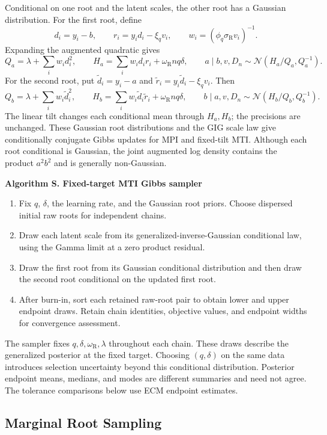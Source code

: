 \documentclass[11pt]{article}
\newcommand{\Normal}{\mathcal{N}}
\newcounter{algorithm}
\renewcommand{\thealgorithm}{S\arabic{algorithm}}
\newenvironment{algorithmblock}[1]{%
  \refstepcounter{algorithm}\par\medskip
  \noindent\textbf{Algorithm \thealgorithm. #1}\par
  \begin{enumerate}[leftmargin=2.2em,itemsep=0.25em,parsep=0pt]%
}{%
  \end{enumerate}\par\medskip
}
\begin{document}
Conditional on one root and the latent scales, the other root has a Gaussian
distribution. For the first root, define
\[
d_i=y_i-b,\qquad r_i=y_i d_i-\xi_qv_i,\qquad
w_i=(\phi_q\sigma_{\mathrm R}v_i)^{-1}.
\]
Expanding the augmented quadratic gives
\[
Q_a=\lambda+\sum_iw_i d_i^2,\qquad
H_a=\sum_iw_i d_i r_i+\omega_{\mathrm R}nq\delta,
\qquad a\mid b,v,D_n\sim\Normal(H_a/Q_a,Q_a^{-1}).
\]
For the second root, put \(\widetilde d_i=y_i-a\) and
\(\widetilde r_i=y_i\widetilde d_i-\xi_qv_i\). Then
\[
Q_b=\lambda+\sum_iw_i\widetilde d_i^2,\qquad
H_b=\sum_iw_i\widetilde d_i\widetilde r_i+\omega_{\mathrm R}nq\delta,
\qquad b\mid a,v,D_n\sim\Normal(H_b/Q_b,Q_b^{-1}).
\]
The linear tilt changes each conditional mean through \(H_a,H_b\); the
precisions are unchanged. These Gaussian root distributions and the GIG scale
law give conditionally conjugate Gibbs updates for MPI and fixed-tilt MTI.
Although each root conditional is Gaussian, the joint augmented log density
contains the product \(a^2b^2\) and is generally non-Gaussian.

\begin{algorithmblock}{Fixed-target MTI Gibbs sampler}
\item Fix \(q\), \(\delta\), the learning rate, and the Gaussian root priors.
Choose dispersed initial raw roots for independent chains.
\item Draw each latent scale from its generalized-inverse-Gaussian conditional
law, using the Gamma limit at a zero product residual.
\item Draw the first root from its Gaussian conditional distribution and then
draw the second root conditional on the updated first root.
\item After burn-in, sort each retained raw-root pair to obtain lower and upper
endpoint draws. Retain chain identities, objective values, and endpoint widths
for convergence assessment.
\end{algorithmblock}

The sampler fixes \(q,\delta,\omega_{\mathrm R},\lambda\) throughout each
chain. These draws describe the generalized posterior at the fixed target. Choosing
\((q,\delta)\) on the same data introduces selection uncertainty beyond this
conditional distribution. Posterior endpoint means, medians, and modes are
different summaries and need not agree. The tolerance comparisons below use
ECM endpoint estimates.

\subsection{Marginal Root Sampling}
\label{sec:supp-mti-marginal}
\end{document}
